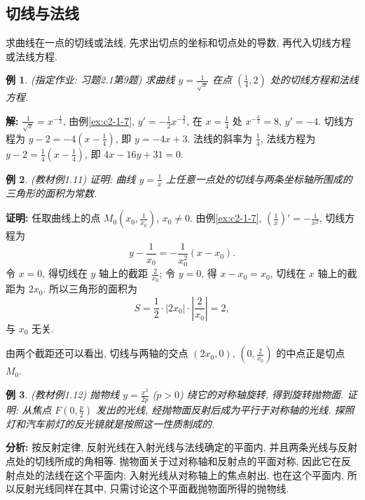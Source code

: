 \documentclass[UTF8,openany]{ctexbook}
\theoremstyle{chinesetextbook}
\newtheorem{example}{例}[section]
\newenvironment{cnproof}{\par\indent\textbf{证明:} \ignorespaces}{\par}
\newenvironment{cnsolution}{\par\indent\textbf{解:} \ignorespaces}{\par}
\begin{document}
\subsection{切线与法线}
求曲线在一点的切线或法线, 先求出切点的坐标和切点处的导数, 再代入切线方程或法线方程.
\begin{example}\label{ex:c2-h1-9}
\textnormal{(指定作业: 习题2.1第9题)} 求曲线 $\displaystyle y=\frac1{\sqrt x}$ 在点 $\displaystyle\left(\frac14,2\right)$ 处的切线方程和法线方程.
\end{example}
\begin{cnsolution}
$\displaystyle\frac1{\sqrt x}=x^{-\frac12}$, 由例\ref{ex:c2-1-7}, $\displaystyle y'=-\frac12x^{-\frac32}$, 在 $\displaystyle x=\frac14$ 处 $x^{-\frac32}=8$, $y'=-4$. 切线方程为 $\displaystyle y-2=-4\left(x-\frac14\right)$, 即 $y=-4x+3$. 法线的斜率为 $\displaystyle\frac14$, 法线方程为 $\displaystyle y-2=\frac14\left(x-\frac14\right)$, 即 $4x-16y+31=0$.
\end{cnsolution}
\begin{example}\label{ex:c2-1-11}
\textnormal{(教材例1.11)} 证明: 曲线 $\displaystyle y=\frac1x$ 上任意一点处的切线与两条坐标轴所围成的三角形的面积为常数.
\end{example}
\begin{cnproof}
任取曲线上的点 $\displaystyle M_0\left(x_0,\frac1{x_0}\right)$, $x_0\ne0$. 由例\ref{ex:c2-1-7}, $\displaystyle\left(\frac1x\right)'=-\frac1{x^2}$, 切线方程为
\[
y-\frac1{x_0}=-\frac1{x_0^2}(x-x_0).
\]
令 $x=0$, 得切线在 $y$ 轴上的截距 $\displaystyle\frac2{x_0}$; 令 $y=0$, 得 $x-x_0=x_0$, 切线在 $x$ 轴上的截距为 $2x_0$. 所以三角形的面积为
\[
S=\frac12\cdot|2x_0|\cdot\left|\frac2{x_0}\right|=2,
\]
与 $x_0$ 无关.
\end{cnproof}
由两个截距还可以看出, 切线与两轴的交点 $(2x_0,0)$, $\displaystyle\left(0,\frac2{x_0}\right)$ 的中点正是切点 $M_0$.
\begin{example}\label{ex:c2-1-12}
\textnormal{(教材例1.12)} 抛物线 $\displaystyle y=\frac{x^2}{2p}$ ($p>0$) 绕它的对称轴旋转, 得到旋转抛物面. 证明: 从焦点 $\displaystyle F\left(0,\frac p2\right)$ 发出的光线, 经抛物面反射后成为平行于对称轴的光线. 探照灯和汽车前灯的反光镜就是按照这一性质制成的.
\end{example}
\par\indent\textbf{分析:} 按反射定律, 反射光线在入射光线与法线确定的平面内, 并且两条光线与反射点处的切线所成的角相等. 抛物面关于过对称轴和反射点的平面对称, 因此它在反射点处的法线在这个平面内; 入射光线从对称轴上的焦点射出, 也在这个平面内, 所以反射光线同样在其中, 只需讨论这个平面截抛物面所得的抛物线.
\end{document}
